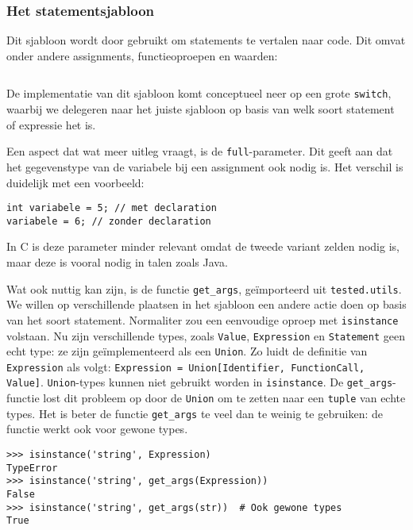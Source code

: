 \inputminted{mako}{sources/c-selector.mako}

\subsubsection{Het statementsjabloon}

Dit sjabloon wordt door \tested{} gebruikt om statements te vertalen naar code.
Dit omvat onder andere assignments, functieoproepen en waarden:

\inputminted{mako}{sources/c-statement.mako}

De implementatie van dit sjabloon komt conceptueel neer op een grote \texttt{switch}, waarbij we delegeren naar het juiste sjabloon op basis van welk soort statement of expressie het is.

Een aspect dat wat meer uitleg vraagt, is de \texttt{full}-parameter.
Dit geeft aan dat het gegevenstype van de variabele bij een assignment ook nodig is.
Het verschil is duidelijk met een voorbeeld:

\begin{verbatim}
int variabele = 5; // met declaration
variabele = 6; // zonder declaration
\end{verbatim}

In C is deze parameter minder relevant omdat de tweede variant zelden nodig is, maar deze is vooral nodig in talen zoals Java.

Wat ook nuttig kan zijn, is de functie \texttt{get\_args}, geïmporteerd uit \texttt{tested.utils}.
We willen op verschillende plaatsen in het sjabloon een andere actie doen op basis van het soort statement.
Normaliter zou een eenvoudige oproep met \texttt{isinstance} volstaan.
Nu zijn verschillende types, zoals \texttt{Value}, \texttt{Expression} en \texttt{Statement} geen echt type: ze zijn geïmplementeerd als een \texttt{Union}.
Zo luidt de definitie van \texttt{Expression} als volgt: \texttt{Expression = Union[Identifier, FunctionCall, Value]}.
\texttt{Union}-types kunnen niet gebruikt worden in \texttt{isinstance}.
De \texttt{get\_args}-functie lost dit probleem op door de \texttt{Union} om te zetten naar een \texttt{tuple} van echte types.
Het is beter de functie \texttt{get\_args} te veel dan te weinig te gebruiken: de functie werkt ook voor gewone types.

\begin{verbatim}
>>> isinstance('string', Expression)
TypeError
>>> isinstance('string', get_args(Expression))
False
>>> isinstance('string', get_args(str))  # Ook gewone types
True
\end{verbatim}

